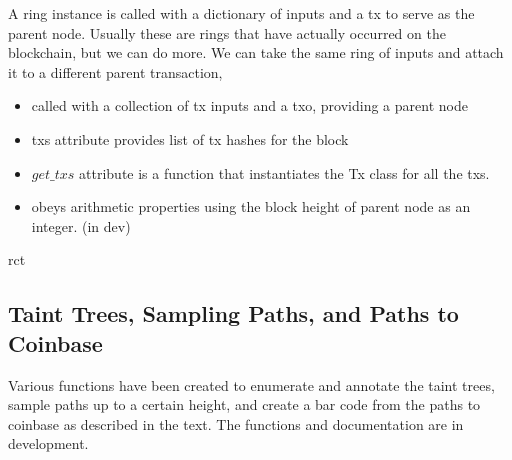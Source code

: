 A ring instance is called with a dictionary of inputs and a tx to serve as the parent node.
Usually these are rings that have actually occurred on the blockchain, but we can do more.
We can take the same ring of inputs and attach it to a different parent transaction, 

\begin{itemize}
\item called with a collection of tx inputs and a txo, providing a parent node
\item txs attribute provides list of tx hashes for the block
\item $get\_txs$ attribute is a function that instantiates the Tx class for all the txs.
\item obeys arithmetic properties using the block height of parent node as an integer.  (in dev) 
\end{itemize}
\gls{rct}

\subsection{Taint Trees, Sampling Paths, and Paths to Coinbase}

Various functions have been created to enumerate and annotate the taint trees, sample paths up to a certain height, and create a bar code from the paths to coinbase as described in the text.
The functions and documentation are in development.


